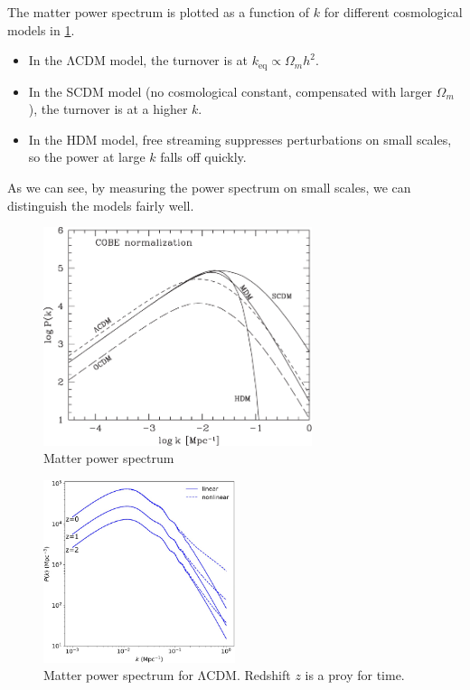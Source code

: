 The matter power spectrum is plotted as a function of $k$ for different cosmological models in \cref{fig:k-power}.
\begin{itemize}
	\item In the ΛCDM model, the turnover is at $k_\text{eq} \propto \Omega_m h^2$.
	\item In the SCDM model (no cosmological constant, compensated with larger $\Omega_m$), the turnover is at a higher $k$.
	\item In the HDM model, free streaming suppresses perturbations on small scales, so the power at large $k$ falls off quickly.
\end{itemize}
As we can see, by measuring the power spectrum on small scales, we can distinguish the models fairly well.

\begin{figure}
	\centering
	\includegraphics[width=0.7\textwidth]{img/ch-03/k-power-spectrum.pdf}
	\caption{Matter power spectrum}
	\label{fig:k-power}
\end{figure}

\begin{figure}
	\centering
	\includegraphics[width=0.5\textwidth]{img/ch-03/lcdm-spectrum.pdf}
	\caption{Matter power spectrum for ΛCDM. Redshift $z$ is a proy for time.}
	\label{fig:power-lcdm}
\end{figure}

